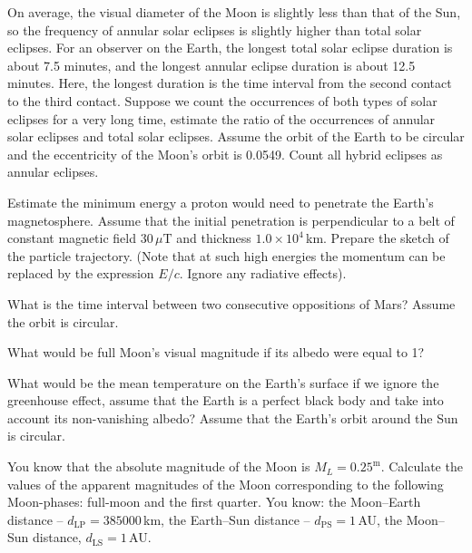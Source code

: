On average, the visual diameter of the Moon is slightly less than that of the
Sun, so the frequency of annular solar eclipses is slightly higher than total
solar eclipses. For an observer on the Earth, the longest total solar eclipse
duration is about 7.5 minutes, and the longest annular eclipse duration is
about 12.5 minutes. Here, the longest duration is the time interval from the
second contact to the third contact. Suppose we count the occurrences of both
types of solar eclipses for a very long time, estimate the ratio of the
occurrences of annular solar eclipses and total solar eclipses. Assume the
orbit of the Earth to be circular and the eccentricity of the Moon's orbit is
0.0549. Count all hybrid eclipses as annular eclipses.

Estimate the minimum energy a proton would need to penetrate the Earth's
magnetosphere. Assume that the initial penetration is perpendicular to a belt
of constant magnetic field $30\,\mu\mathrm{T}$ and thickness
$1.0 \times 10^{4}$\,km. Prepare the sketch of the particle trajectory. (Note
that at such high energies the momentum can be replaced by the expression
$E/c$. Ignore any radiative effects).

What is the time interval between two consecutive oppositions of Mars? Assume
the orbit is circular.

What would be full Moon's visual magnitude if its albedo were equal to 1?

What would be the mean temperature on the Earth's surface if we ignore the
greenhouse effect, assume that the Earth is a perfect black body and take into
account its non-vanishing albedo? Assume that the Earth's orbit around the Sun
is circular.

You know that the absolute magnitude of the Moon is
$M_L = 0.25^{\mathrm{m}}$. Calculate the values of the apparent magnitudes of
the Moon corresponding to the following Moon-phases: full-moon and the first
quarter. You know: the Moon--Earth distance --
$d_{\mathrm{LP}} = 385000$\,km, the Earth--Sun distance --
$d_{\mathrm{PS}} = 1$\,AU, the Moon--Sun distance,
$d_{\mathrm{LS}} = 1$\,AU.

